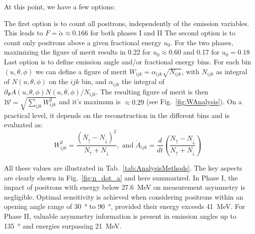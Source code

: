 \begin{refsection}
    At this point, we have a few options:
    \begin{outline}
        \1[A] The first option is to count all positrons, independently of the emission variables. This leads to $F=\tilde\alpha \approx 0.166$ for both phases I and II
        \1[T] The second option is to count only positrons above a given fractional energy $u_0$. For the two phases, maximizing the figure of merit results in 0.22 for $u_0\approx0.60$ and 0.17 for $u_0=0.18$
        \1[W] Last option is to define emission angle and/or fractional energy bins. 
        For each bin $(u, \theta, \phi)$ we can define a figure of merit $W_{ijk} = \alpha_{ijk} \sqrt{N_{ijk}}$, with $N_{ijk}$ as integral of $ N(u, \theta, \phi)$ on the $ijk$ bin, and $\alpha_{ijk}$ the integral of $ \partial_\Psi A(u,
	\theta, \phi) N(u, \theta, \phi) / N_{ijk}$.
        The resulting figure of merit is then $\mathcal{W} =  \sqrt{\sum_{ijk} W_{ijk}^2}$ and it's maximum is $\approx0.29$ (see Fig.~\ref{fig:WAnalysis}).
        On a practical level, it depends on the reconstruction in the different bins and is evaluated as:
        $$W^2_{ijk} = \frac{(N_\uparrow - N_\downarrow)^2}{N_\uparrow + N_\downarrow},\text{ and }  \dot A_{ijk} = \frac{d}{dt} \left( \frac{N_\uparrow - N_\downarrow}{N_\uparrow + N_\downarrow} \right)$$
    \end{outline}
    All these values are illustrated in Tab.~\ref{tab:AnalysisMethods}. 
    The key aspects are clearly shown in Fig.~\ref{fig:n_dot_a} and here summarized.
    In Phase I, the impact of positrons with energy below \SI{27.6}{MeV} on measurement asymmetry is negligible. 
    Optimal sensitivity is achieved when considering positrons within an opening angle range of \SI{30}{\degree} to \SI{90}{\degree}, provided their energy exceeds \SI{41}{MeV}. 
    For Phase II, valuable asymmetry information is present in emission angles up to \SI{135}{\degree} and energies surpassing \SI{21}{MeV}.
    

\end{refsection}
